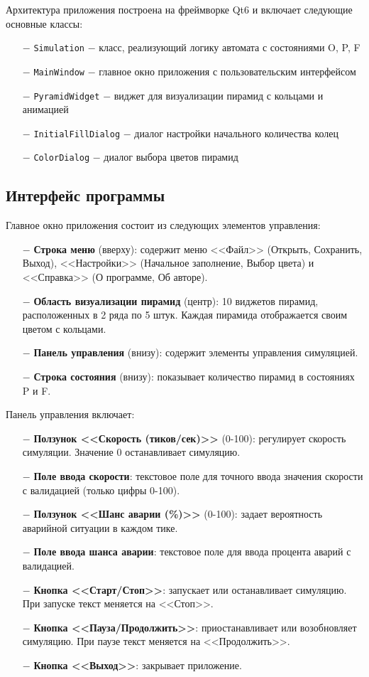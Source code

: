 \documentclass[oneside,a4paper,14pt]{extarticle}
\begin{document}
Архитектура приложения построена на фреймворке Qt6 и включает следующие основные классы:
\begin{itemize}
  \item[$-$] \texttt{Simulation} $-$ класс, реализующий логику автомата с состояниями O, P, F
  \item[$-$] \texttt{MainWindow} $-$ главное окно приложения с пользовательским интерфейсом
  \item[$-$] \texttt{PyramidWidget} $-$ виджет для визуализации пирамид с кольцами и анимацией
  \item[$-$] \texttt{InitialFillDialog} $-$ диалог настройки начального количества колец
  \item[$-$] \texttt{ColorDialog} $-$ диалог выбора цветов пирамид
\end{itemize}

\subsection*{Интерфейс программы}

Главное окно приложения состоит из следующих элементов управления:

\begin{itemize}
  \item[$-$] \textbf{Строка меню} (вверху): содержит меню <<Файл>> (Открыть, Сохранить, Выход), <<Настройки>> (Начальное заполнение, Выбор цвета) и <<Справка>> (О программе, Об авторе).
  \item[$-$] \textbf{Область визуализации пирамид} (центр): 10 виджетов пирамид, расположенных в 2 ряда по 5 штук. Каждая пирамида отображается своим цветом с кольцами.
  \item[$-$] \textbf{Панель управления} (внизу): содержит элементы управления симуляцией.
  \item[$-$] \textbf{Строка состояния} (внизу): показывает количество пирамид в состояниях P и F.
\end{itemize}

Панель управления включает:
\begin{itemize}
  \item[$-$] \textbf{Ползунок <<Скорость (тиков/сек)>>} (0-100): регулирует скорость симуляции. Значение 0 останавливает симуляцию.
  \item[$-$] \textbf{Поле ввода скорости}: текстовое поле для точного ввода значения скорости с валидацией (только цифры 0-100).
  \item[$-$] \textbf{Ползунок <<Шанс аварии (\%)>>} (0-100): задает вероятность аварийной ситуации в каждом тике.
  \item[$-$] \textbf{Поле ввода шанса аварии}: текстовое поле для ввода процента аварий с валидацией.
  \item[$-$] \textbf{Кнопка <<Старт/Стоп>>}: запускает или останавливает симуляцию. При запуске текст меняется на <<Стоп>>.
  \item[$-$] \textbf{Кнопка <<Пауза/Продолжить>>}: приостанавливает или возобновляет симуляцию. При паузе текст меняется на <<Продолжить>>.
  \item[$-$] \textbf{Кнопка <<Выход>>}: закрывает приложение.
\end{itemize}
\end{document}
